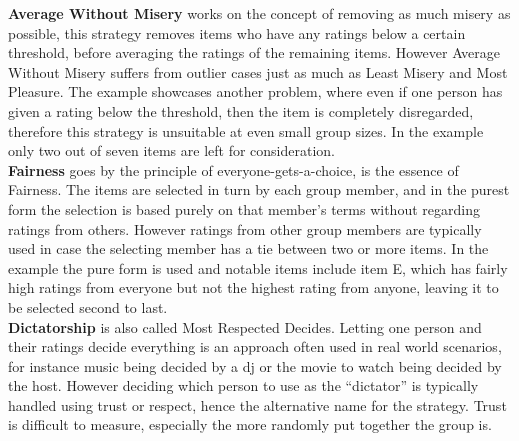 \textbf{Average Without Misery} works on the concept of removing as much misery as possible, this strategy removes items who have any ratings below a certain threshold, before averaging the ratings of the remaining items. However Average Without Misery suffers from outlier cases just as much as Least Misery and Most Pleasure. The example showcases another problem, where even if one person has given a rating below the threshold, then the item is completely disregarded, therefore this strategy is unsuitable at even small group sizes. In the example only two out of seven items are left for consideration.\\

\textbf{Fairness} goes by the principle of everyone-gets-a-choice, is the essence of Fairness. The items are selected in turn by each group member, and in the purest form the selection is based purely on that member's terms without regarding ratings from others. However ratings from other group members are typically used in case the selecting member has a tie between two or more items. In the example the pure form is used and notable items include item E, which has fairly high ratings from everyone but not the highest rating from anyone, leaving it to be selected second to last.\\

\textbf{Dictatorship} is also called Most Respected Decides. Letting one person and their ratings decide everything is an approach often used in real world scenarios, for instance music being decided by a dj or the movie to watch being decided by the host. However deciding which person to use as the “dictator” is typically handled using trust or respect, hence the alternative name for the strategy. Trust is difficult to measure, especially the more randomly put together the group is.

